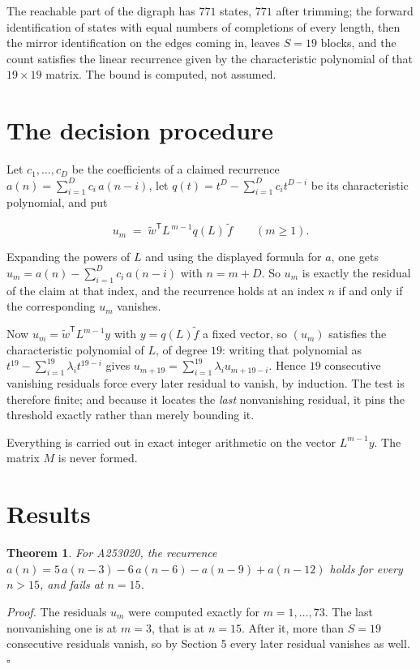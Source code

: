 \documentclass[11pt]{article}
\newtheorem{theorem}{Theorem}
\theoremstyle{definition}
\begin{document}
The reachable part of the digraph has $771$ states, $771$ after trimming; the forward identification of states with equal numbers of completions of every length, then the mirror identification on the edges coming in, leaves $S = 19$ blocks, and the count satisfies the linear recurrence given by the characteristic polynomial of that $19\times19$ matrix. The bound is computed, not assumed.

\section{The decision procedure}

Let $c_1,\dots,c_D$ be the coefficients of a claimed recurrence $a(n) = \sum_{i=1}^{D} c_i\,a(n-i)$, let $q(t) = t^{D} - \sum_{i=1}^{D} c_i t^{D-i}$ be its characteristic polynomial, and put

\[u_m \;=\; \tilde w^{\mathsf T} L^{\,m-1} q(L)\,\tilde f \qquad (m \ge 1).\]

Expanding the powers of $L$ and using the displayed formula for $a$, one gets $u_m = a(n) - \sum_{i=1}^{D} c_i\,a(n-i)$ with $n = m + D$. So $u_m$ is exactly the residual of the claim at that index, and the recurrence holds at an index $n$ if and only if the corresponding $u_m$ vanishes.

Now $u_m = \tilde w^{\mathsf T} L^{m-1} y$ with $y = q(L)\tilde f$ a fixed vector, so $(u_m)$ satisfies the characteristic polynomial of $L$, of degree $19$: writing that polynomial as $t^{19} - \sum_{i=1}^{19} \lambda_i t^{19-i}$ gives $u_{m+19} = \sum_{i=1}^{19} \lambda_i u_{m+19-i}$. Hence $19$ consecutive vanishing residuals force every later residual to vanish, by induction. The test is therefore finite; and because it locates the {\itshape last} nonvanishing residual, it pins the threshold exactly rather than merely bounding it.

Everything is carried out in exact integer arithmetic on the vector $L^{m-1}y$. The matrix $M$ is never formed.

\section{Results}

\begin{theorem} For A253020, the recurrence $a(n) = 5\,a(n-3) - 6\,a(n-6) - a(n-9) + a(n-12)$ holds for every $n > 15$, and fails at $n = 15$.\end{theorem}

{\itshape Proof.} The residuals $u_m$ were computed exactly for $m = 1,\dots,73$. The last nonvanishing one is at $m = 3$, that is at $n = 15$. After it, more than $S = 19$ consecutive residuals vanish, so by Section 5 every later residual vanishes as well. $\square$
\end{document}
